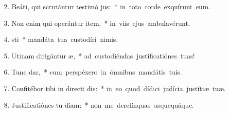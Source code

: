 \begin{flushleft}
\begin{enumerate}[leftmargin=*]
\setcounter{enumi}{1}

\item Beáti, qui scrutántur testimó jus:~* \mbox{in toto corde exquírunt eum.}
\item Non enim qui operántur item,~* \mbox{in viis ejus ambulavérunt.}
\item {} sti~* \mbox{mandáta tua custodíri nimis.}
\item Utinam dirigántur  æ,~* \mbox{ad custodiéndas justificatiónes tuas!}
\item Tunc  dar,~* \mbox{cum perspéxero in ómnibus mandátis tuis.}
\item Confitébor tibi in directi dis:~* \mbox{in eo quod dídici judícia justítiæ tuæ.}
\item Justificatiónes tu diam:~* \mbox{non me derelínquas usquequáque.}

\end{enumerate}
\end{flushleft}

